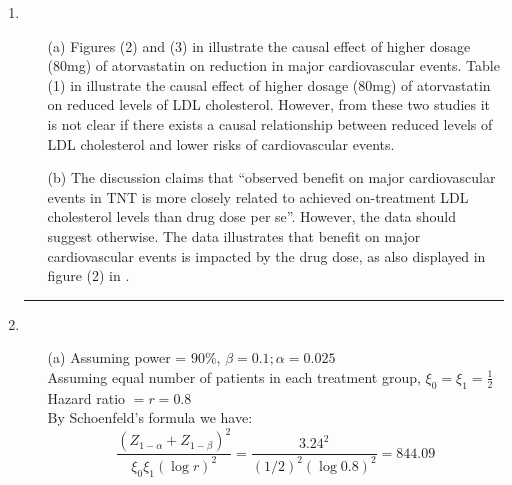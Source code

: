 \documentclass[11pt,a4paper]{article}
\begin{document}
\begin{enumerate}
\rule{\textwidth}{1pt}
\vspace{1in}
\item
\begin{enumerate}
\item[(a)] Figures (2) and (3) in \cite{larosa2005intensive} illustrate the causal effect of higher dosage (80mg) of atorvastatin on reduction in major cardiovascular events. Table (1) in \cite{larosa2007safety} illustrate the causal effect of higher dosage (80mg) of atorvastatin on reduced levels of LDL cholesterol. However, from these two studies it is not clear if there exists a causal relationship between reduced levels of LDL cholesterol and lower risks of cardiovascular events. 

\item[(b)] The discussion claims that ``observed benefit on major cardiovascular events in TNT is more closely related to achieved 
on-treatment LDL cholesterol levels than drug dose per se''. However, the data should suggest otherwise. The data illustrates that benefit on major cardiovascular events is impacted by the drug dose, as also displayed in figure (2) in \cite{larosa2005intensive}. 
\end{enumerate}

\rule{\textwidth}{1pt}
\vspace{1in}
\item
\begin{enumerate}
\item[(a)] 
Assuming power = 90\%, $\beta = 0.1; \alpha = 0.025$ \\
Assuming equal number of patients in each treatment group, $\xi_0=\xi_1=\frac{1}{2}$ \\
Hazard ratio $= r = 0.8$ \\
By Schoenfeld’s formula we have:
\[ \dfrac{(Z_{1-\alpha}+Z_{1-\beta})^ 2}{\xi_0\xi_1(\log r)^2} = \dfrac{3.24^ 2}{(1/2)^2(\log 0.8)^2} = 844.09 \]


\end{enumerate}
\end{enumerate}
\end{document}
